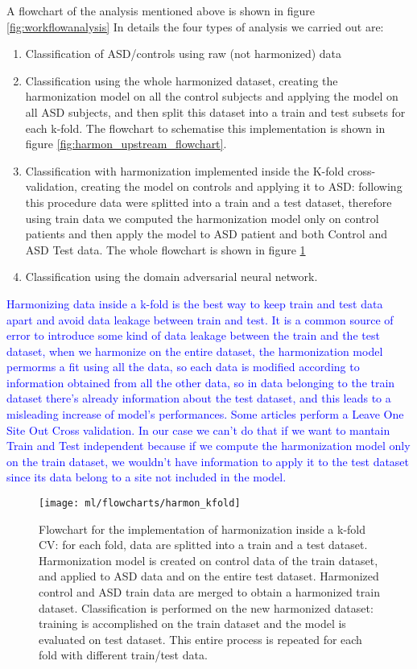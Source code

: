 \documentclass[11pt]{report}
\begin{document}
A flowchart of the analysis mentioned above is shown in figure \ref{fig:workflowanalysis}
In details the four types of analysis we carried out are:
\begin{enumerate}
\item Classification of ASD/controls using raw (not harmonized) data
\item Classification using the whole harmonized dataset, creating the harmonization model on all the control subjects and applying the model on all ASD subjects, and then split this dataset into a train and test subsets for each k-fold. The flowchart to schematise this implementation is shown in figure \ref{fig:harmon_upstream_flowchart}.
\item Classification with harmonization implemented inside the K-fold cross-validation, creating the model on controls and applying it to ASD: following this procedure data were splitted into a train and a test dataset, therefore using train data we computed the harmonization model only on control patients and then apply the model to ASD patient and both Control and ASD Test data.
The whole flowchart is shown in figure \ref{fig:harmon_kfold_flowchart}
\item Classification using the domain adversarial neural network.
\end{enumerate}

\textcolor{blue}{
Harmonizing data inside a k-fold is the best way to keep train and test data apart and avoid data leakage between train and test.
It is a common source of error to introduce some kind of data leakage between the train and the test dataset, when we harmonize on the entire dataset, the harmonization model permorms a fit using all the data, so each data is modified according to information obtained from all the other data, so in data belonging to the train dataset there's already information about the test dataset, and this leads to a misleading increase of model's performances.
Some articles perform a Leave One Site Out Cross validation. In our case we can't do that if we want to mantain Train and Test independent because if we compute the harmonization model only on the train dataset, we wouldn't have information to apply it to the test dataset since its data belong to a site not included in the model.
}


\begin{figure}[h!]
\centering
\texttt{[image: ml/flowcharts/harmon\_kfold]}
\caption{Flowchart for the implementation of harmonization inside a k-fold CV: for each fold, data are splitted into a train and a test dataset. Harmonization model is created on control data of the train dataset, and applied to ASD data and on the entire test dataset. Harmonized control and ASD train data are merged to obtain a harmonized train dataset. Classification is performed on the new harmonized dataset: training is accomplished on the train dataset and the model is evaluated on test dataset. This entire process is repeated for each fold with different train/test data.}
\label{fig:harmon_kfold_flowchart}
\end{figure}
\end{document}
